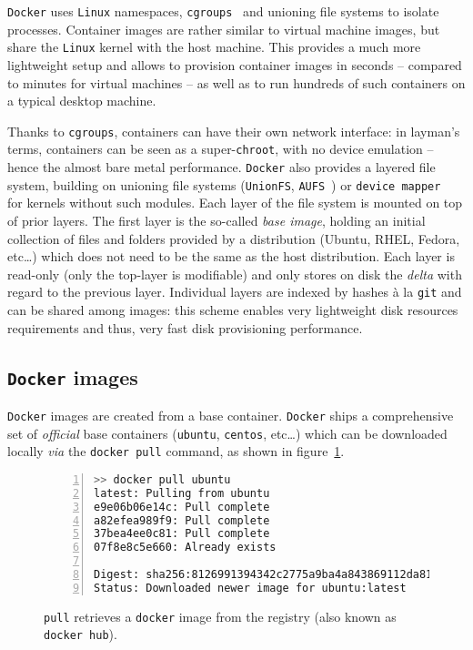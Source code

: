 \documentclass[a4paper]{jpconf}
\begin{document}
\texttt{Docker} uses \texttt{Linux} namespaces,
\texttt{cgroups}~\cite{ref-cgroups} and unioning file systems to isolate
processes.
Container images are rather similar to virtual machine images, but share the
\texttt{Linux} kernel with the host machine.
This provides a much more lightweight setup and allows to provision container
images in seconds -- compared to minutes for virtual machines -- as well as to
run hundreds of such containers on a typical desktop machine.

Thanks to \texttt{cgroups}, containers can have their own network interface: in
layman's terms, containers can be seen as a super-\texttt{chroot}, with no
device emulation -- hence the almost bare metal performance.
\texttt{Docker} also provides a layered file system, building on unioning file
systems (\texttt{UnionFS}\cite{ref-unionfs}, \texttt{AUFS}~\cite{ref-aufs}) or
\texttt{device mapper}~\cite{ref-devicemapper} for
kernels without such modules.
Each layer of the file system is mounted on top of prior layers.
The first layer is the so-called \emph{base image}, holding an initial
collection of files and folders provided by a distribution (Ubuntu, RHEL,
Fedora, etc\ldots) which does not need to be the same as the host
distribution.
Each layer is read-only (only the top-layer is modifiable) and only stores on disk the \emph{delta} with regard to the previous
layer.
Individual layers are indexed by hashes \`a la \texttt{git} and can be shared
among images: this scheme enables very lightweight disk resources
requirements and thus, very fast disk provisioning performance.

\subsection{\texttt{Docker} images}
\texttt{Docker} images are created from a base container.
\texttt{Docker} ships a comprehensive set of \emph{official} base containers
(\texttt{ubuntu}, \texttt{centos}, etc\ldots) which can be downloaded locally
\emph{via} the \texttt{docker pull} command, as shown in
figure~\ref{fig-docker-pull}.

\begin{figure}[h]
\begin{lstlisting}[language=sh,
    basicstyle=\tiny,
    frame=trbl,
    numbers=left,
    showstringspaces=false,
    stringstyle=\ttfamily]
>> docker pull ubuntu
latest: Pulling from ubuntu
e9e06b06e14c: Pull complete 
a82efea989f9: Pull complete 
37bea4ee0c81: Pull complete 
07f8e8c5e660: Already exists 

Digest: sha256:8126991394342c2775a9ba4a843869112da8156037451fc424454db43c25d8b0
Status: Downloaded newer image for ubuntu:latest
\end{lstlisting}
\caption{\label{fig-docker-pull}\texttt{pull} retrieves a \texttt{docker} image
from the registry (also known as \texttt{docker hub}).}
\end{figure}
\end{document}
